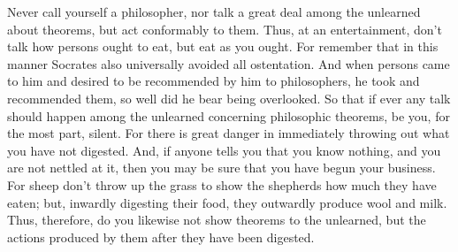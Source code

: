 Never call yourself a philosopher, nor talk a great deal among
the unlearned about theorems, but act conformably to them. Thus, at
an entertainment, don't talk how persons ought to eat, but eat as
you ought. For remember that in this manner Socrates also universally
avoided all ostentation. And when persons came to him and desired
to be recommended by him to philosophers, he took and recommended
them, so well did he bear being overlooked. So that if ever any talk
should happen among the unlearned concerning philosophic theorems,
be you, for the most part, silent. For there is great danger in immediately
throwing out what you have not digested. And, if anyone tells you
that you know nothing, and you are not nettled at it, then you may
be sure that you have begun your business. For sheep don't throw up
the grass to show the shepherds how much they have eaten; but, inwardly
digesting their food, they outwardly produce wool and milk. Thus,
therefore, do you likewise not show theorems to the unlearned, but
the actions produced by them after they have been digested.

